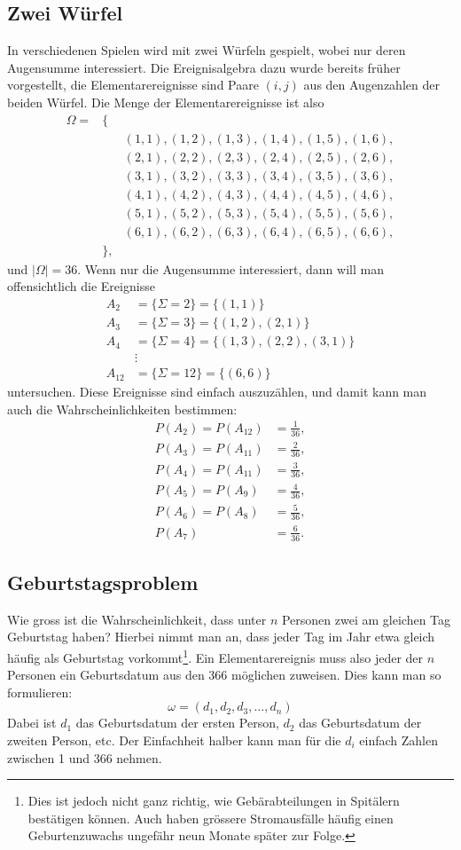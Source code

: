 \subsection{Zwei Würfel}
In verschiedenen Spielen wird mit zwei Würfeln gespielt, wobei nur
deren Augensumme interessiert.
Die Ereignisalgebra dazu wurde bereits
früher vorgestellt, die Elementarereignisse sind Paare $(i,j)$ aus
den Augenzahlen der beiden Würfel.
Die Menge der Elementarereignisse
ist also
\begin{eqnarray*}
\Omega=&\{&\\
&&(1,1),(1,2),(1,3),(1,4),(1,5),(1,6),\\
&&(2,1),(2,2),(2,3),(2,4),(2,5),(2,6),\\
&&(3,1),(3,2),(3,3),(3,4),(3,5),(3,6),\\
&&(4,1),(4,2),(4,3),(4,4),(4,5),(4,6),\\
&&(5,1),(5,2),(5,3),(5,4),(5,5),(5,6),\\
&&(6,1),(6,2),(6,3),(6,4),(6,5),(6,6),\\
&\},&
\end{eqnarray*}
und $|\Omega|=36$.
Wenn nur die Augensumme interessiert, dann will
man offensichtlich die Ereignisse
\begin{align*}
A_2&=\{\Sigma=2\}=\{(1,1)\}\\
A_3&=\{\Sigma=3\}=\{(1,2),(2,1)\}\\
A_4&=\{\Sigma=4\}=\{(1,3),(2,2),(3,1)\}\\
&\vdots\\
A_{12}&=\{\Sigma=12\}=\{(6,6)\}
\end{align*}
untersuchen.
Diese Ereignisse sind einfach auszuzählen, und damit kann man auch
die Wahrscheinlichkeiten bestimmen:
\begin{align*}
P(A_2)=P(A_{12})&=\frac{1}{36},\\
P(A_3)=P(A_{11})&=\frac{2}{36},\\
P(A_4)=P(A_{11})&=\frac{3}{36},\\
P(A_5)=P(A_9)&=\frac{4}{36},\\
P(A_6)=P(A_8)&=\frac{5}{36},\\
P(A_7)&=\frac{6}{36}.
\end{align*}

\subsection{Geburtstagsproblem}
Wie gross ist die Wahrscheinlichkeit, dass unter $n$ Personen zwei
am gleichen Tag Geburtstag haben? Hierbei nimmt man an, dass
jeder Tag im Jahr etwa gleich häufig als Geburtstag
vorkommt\footnote{Dies ist
jedoch nicht ganz richtig, wie Gebärabteilungen in Spitälern
bestätigen können.
Auch haben grössere Stromausfälle häufig
einen Geburtenzuwachs ungefähr neun Monate später zur Folge.}.
Ein Elementarereignis muss also jeder der $n$ Personen ein
Geburtsdatum aus den $366$ möglichen zuweisen.
Dies kann man so
formulieren:
\[
\omega=(d_1, d_2, d_3,\dots,d_n)
\]
Dabei ist $d_1$ das Geburtsdatum der ersten Person, $d_2$ das
Geburtsdatum der zweiten Person, etc.
Der Einfachheit halber kann
man für die $d_i$ einfach Zahlen zwischen 1 und 366 nehmen.

